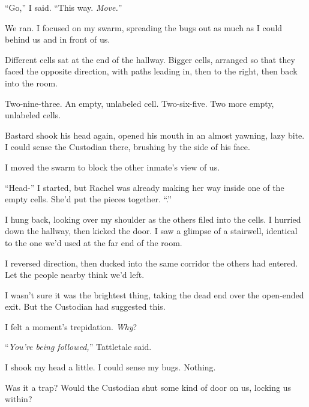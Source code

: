 ``Go,'' I said.  ``This way.  \emph{Move.}''



We ran.  I focused on my swarm, spreading the bugs out as much as I could behind us and in front of us.



Different cells sat at the end of the hallway.  Bigger cells, arranged so that they faced the opposite direction, with paths leading in, then to the right, then back into the room.



Two-nine-three.  An empty, unlabeled cell.  Two-six-five.  Two more empty, unlabeled cells.



Bastard shook his head again, opened his mouth in an almost yawning, lazy bite.  I could sense the Custodian there, brushing by the side of his face.



I moved the swarm to block the other inmate's view of us.



``Head-'' I started, but Rachel was already making her way inside one of the empty cells.  She'd put the pieces together.  ``\ldotsright.''



I hung back, looking over my shoulder as the others filed into the cells.  I hurried down the hallway, then kicked the door.  I saw a glimpse of a stairwell, identical to the one we'd used at the far end of the room.



I reversed direction, then ducked into the same corridor the others had entered.  Let the people nearby think we'd left.



I wasn't sure it was the brightest thing, taking the dead end over the open-ended exit.  But the Custodian had suggested this.



I felt a moment's trepidation.  \emph{Why}?



``\emph{You're being followed,}'' Tattletale said.



I shook my head a little.  I could sense my bugs.  Nothing.



Was it a trap?  Would the Custodian shut some kind of door on us, locking us within?



